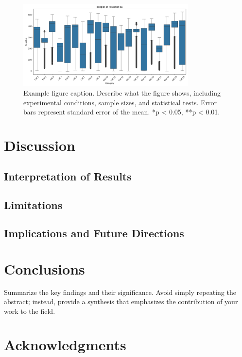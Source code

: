 \documentclass[12pt,a4paper]{article}
\begin{document}
\begin{figure}[H]
    \centering
    \includegraphics[width=0.8\textwidth]{"../E_0.png"}
    \caption{Example figure caption. Describe what the figure shows, including experimental conditions, sample sizes, and statistical tests. Error bars represent standard error of the mean. *p < 0.05, **p < 0.01.}
    \label{fig:example}
\end{figure}



\section{Discussion}

\subsection{Interpretation of Results}


\subsection{Limitations}

\subsection{Implications and Future Directions}



\section{Conclusions}

Summarize the key findings and their significance. Avoid simply repeating the abstract; instead, provide a synthesis that emphasizes the contribution of your work to the field.


\section*{Acknowledgments}
\end{document}
